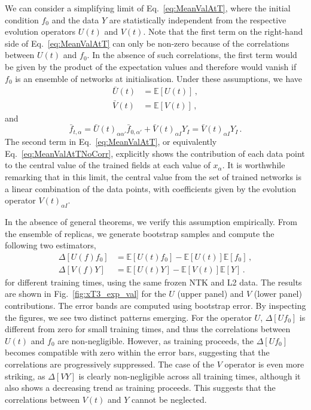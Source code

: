 We can consider a simplifying limit of Eq.~\eqref{eq:MeanValAtT}, where the
initial condition $f_0$ and the data $Y$ are statistically independent
from the respective
evolution operators $U(t)$ and $V(t)$. Note that the first term on the right-hand
side of Eq.~\eqref{eq:MeanValAtT} can only be non-zero because of the
correlations between $U(t)$ and $f_0$. In the absence of such correlations, the
first term would be given by the product of the expectation values and therefore
would vanish if $f_0$ is an ensemble of networks at initialisation. Under these
assumptions, we have
\begin{align}
    \label{eq:MeanUt}
    \bar{U}(t)
        &= \mathbb{E}\left[U(t)\right]\, , \\
    \label{eq:MeanVt}
    \bar{V}(t)
        &= \mathbb{E}\left[V(t)\right]\, ,
\end{align}
and
\begin{equation}
    \label{eq:MeanValAtTNoCorr}
    \bar{f}_{t,\alpha} = \bar{U}(t)_{\alpha\alpha'} \bar{f}_{0,\alpha'}
        + \bar{V}(t)_{\alpha I} Y_I = \bar{V}(t)_{\alpha I} Y_I \, .
\end{equation}
The second term in Eq.~\eqref{eq:MeanValAtT}, or equivalently
Eq.~\eqref{eq:MeanValAtTNoCorr}, explicitly shows the contribution of each data
point to the central value of the trained fields at each value of $x_{\alpha}$.
It is worthwhile remarking that in this limit, the central value from the set of
trained networks is a linear combination of the data points, with coefficients
given by the evolution operator $V(t)_{\alpha I}$.

In the absence of general theorems, we verify this assumption empirically.
From the ensemble of replicas, we generate bootstrap samples and compute the
following two estimators,
\begin{align}
    \label{eq:DeltaExpValUtF0}
    \Delta[U(f)f_0] &= \mathbb{E}\left[U(t) f_{0}\right] 
      - \mathbb{E}\left[U(t) \right] \mathbb{E}\left[f_{0}\right]\, , \\
    \label{eq:DeltaExpValVtY}
    \Delta[V(f)Y] &= \mathbb{E}\left[U(t) Y\right] 
      - \mathbb{E}\left[V(t) \right] \mathbb{E}\left[Y\right]\, .
\end{align}
for different training times, using the same frozen NTK and L2 data. The results
are shown in Fig.~\ref{fig:xT3_exp_val} for the $U$ (upper panel) and $V$ (lower
panel) contributions. The error bands are computed using bootstrap error. By
inspecting the figures, we see two distinct patterns emerging. For the operator 
$U$, $\Delta[U f_0]$ is different from zero for small training times, and thus the
correlations between $U(t)$ and $f_0$ are non-negligible. However, as training
proceeds, the $\Delta[U f_0]$ becomes compatible with zero within the error bars, 
suggesting that the correlations are progressively suppressed.
The case of the $V$ operator is even more striking, as $\Delta[V Y]$ is clearly
non-negligible across all training times, although it also shows a decreasing trend as
training proceeds. This suggests that the correlations between $V(t)$ and $Y$
cannot be neglected. 

